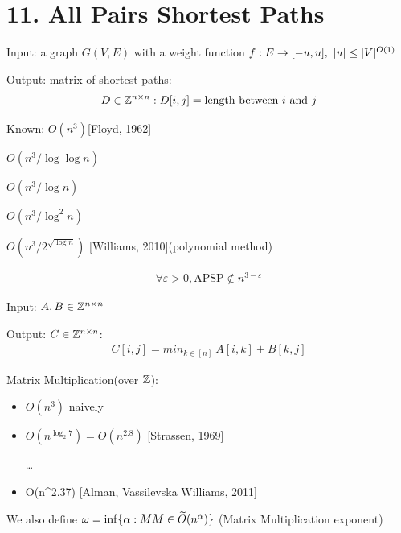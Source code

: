 \section{11. All Pairs Shortest Paths}

\begin{df}[APSP]
	Input: a graph $G(V, E)$ with a weight function $\\f : E \to [-u, u], \ |u| \leq |V|^{O(1)}$

	Output: matrix of shortest paths:
	\begin{align*}
		D \in \mathbb{Z}^{n \times n} : D[i, j] = \text{length between $i$ and $j$}
	\end{align*}

	Known: $O(n^3)$[Floyd, 1962]

	$O(n^3 / \log\log n)$

	$O(n^3 / \log n)$

	$O(n^3 / \log^2 n)$

	$O(n^3 / 2^{\sqrt{\log n}})$ [Williams, 2010](polynomial method)
\end{df}

\begin{df}
	\begin{align*}
		\forall \varepsilon > 0, \text{APSP} \not \in n^{3 - \varepsilon}
	\end{align*}
\end{df}

\begin{df}
	\label{df:matrix_multiplication_min_plus}
	Input: $A, B \in \mathbb{Z}^{n \times n}$

	Output: $C \in \mathbb{Z}^{n \times n}$:
	\begin{align*}
		C[i, j] = min_{k \in [n]} \ A[i, k] + B[k, j]
	\end{align*}

\end{df}

Matrix Multiplication(over $\mathbb{Z}$):
\begin{itemize}
	\item $O(n^3)$ naively
	\item $O(n^{\log_2 7}) = O(n^{2.8})$ [Strassen, 1969]

		\dots

	\item O(n^{2.37}) [Alman, Vassilevska Williams, 2011]
\end{itemize}

We also define $\omega = \inf \{ \alpha : MM \in \widetilde{O}(n^{\alpha}) \}$ (Matrix Multiplication exponent)

